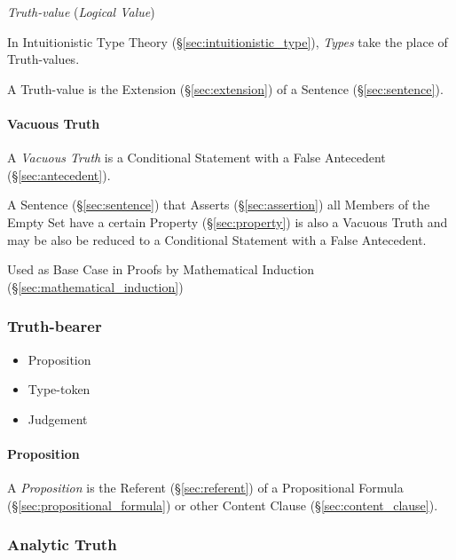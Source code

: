 \emph{Truth-value} (\emph{Logical Value})

In Intuitionistic Type Theory (\S\ref{sec:intuitionistic_type}),
\emph{Types} take the place of Truth-values.

A Truth-value is the Extension (\S\ref{sec:extension}) of a Sentence
(\S\ref{sec:sentence}).



\paragraph{Vacuous Truth}\label{sec:vacuous_truth}\hfill

A \emph{Vacuous Truth} is a Conditional Statement with a False
Antecedent (\S\ref{sec:antecedent}).

A Sentence (\S\ref{sec:sentence}) that Asserts (\S\ref{sec:assertion})
all Members of the Empty Set have a certain Property
(\S\ref{sec:property}) is also a Vacuous Truth and may be also be
reduced to a Conditional Statement with a False Antecedent.

Used as Base Case in Proofs by Mathematical Induction
(\S\ref{sec:mathematical_induction})



\subsubsection{Truth-bearer}\label{sec:truth_bearer}

\begin{itemize}
  \item Proposition
  \item Type-token
  \item Judgement
\end{itemize}



\paragraph{Proposition}\label{sec:proposition}\hfill

A \emph{Proposition} is the Referent (\S\ref{sec:referent}) of a
Propositional Formula (\S\ref{sec:propositional_formula}) or other
Content Clause (\S\ref{sec:content_clause}).



\subsubsection{Analytic Truth}\label{sec:analytic_truth}

